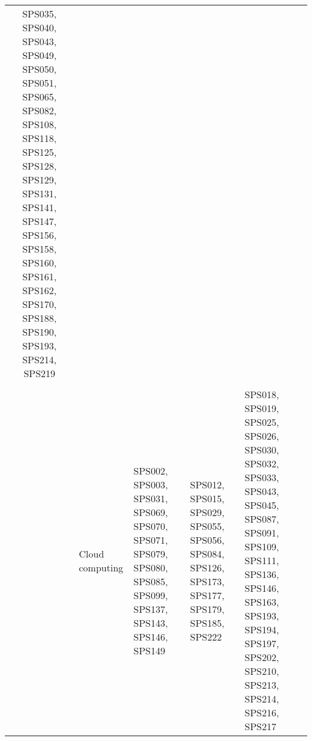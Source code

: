 \begin{longtable}{c Z Y Y Y}
SPS035, SPS040, SPS043, SPS049, SPS050, SPS051, SPS065, SPS082, SPS108, SPS118, SPS125, SPS128, SPS129, SPS131, SPS141, SPS147, SPS156, SPS158, SPS160, SPS161, SPS162, SPS170, SPS188, SPS190, SPS193, SPS214, SPS219 \\\\ & Cloud computing & SPS002, SPS003, SPS031, SPS069, SPS070, SPS071, SPS079, SPS080, SPS085, SPS099, SPS137, SPS143, SPS146, SPS149 & SPS012, SPS015, SPS029, SPS055, SPS056, SPS084, SPS126, SPS173, SPS177, SPS179, SPS185, SPS222 & SPS018, SPS019, SPS025, SPS026, SPS030, SPS032, SPS033, SPS043, SPS045, SPS087, SPS091, SPS109, SPS111, SPS136, SPS146, SPS163, SPS193, SPS194, SPS197, SPS202, SPS210, SPS213, SPS214, SPS216, SPS217 \\ \bottomrule
\end{longtable}
\twocolumn
\onecolumn

